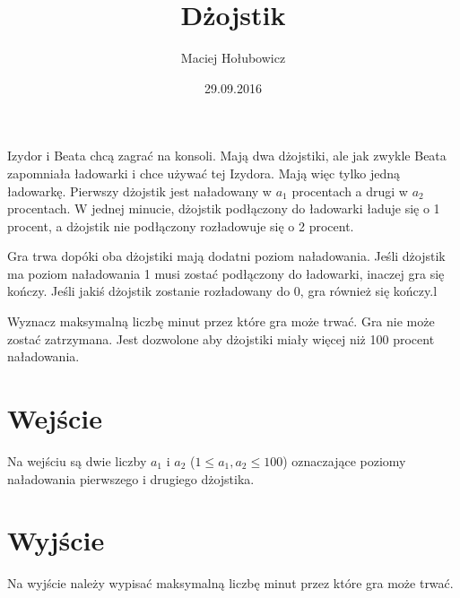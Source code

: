 \documentclass[zad,zawodnik,utf8]{sinol}
\title{Dżojstik}
\author{Maciej Hołubowicz} %
\date{29.09.2016}
\begin{document}
  \begin{tasktext}%
  Izydor i Beata chcą zagrać na konsoli. Mają dwa dżojstiki, ale jak zwykle Beata zapomniała ładowarki i chce używać tej Izydora. Mają więc tylko jedną ładowarkę. Pierwszy dżojstik jest naładowany w $a_1$ procentach a drugi w $a_2$ procentach. W jednej minucie, dżojstik podłączony do ładowarki ładuje się o 1 procent, a dżojstik nie podłączony rozładowuje się o 2 procent.
  
  Gra trwa dopóki oba dżojstiki mają dodatni poziom naładowania. Jeśli dżojstik ma poziom naładowania 1 musi zostać podłączony do ładowarki, inaczej gra się kończy. Jeśli jakiś dżojstik zostanie rozładowany do 0, gra również się kończy.l
  
  Wyznacz maksymalną liczbę minut przez które gra może trwać. Gra nie może zostać zatrzymana. Jest dozwolone aby dżojstiki miały więcej niż 100 procent naładowania.
  
  
 \section{Wejście}
    
  Na wejściu są dwie liczby $a_1$ i $a_2$ ($ 1 \leq a_1, a_2 \leq 100$) oznaczające poziomy naładowania pierwszego i drugiego dżojstika.

  \section{Wyjście}
    Na wyjście należy wypisać maksymalną liczbę minut przez które gra może trwać.
    
     \makecompactexample

  \end{tasktext}
\end{document}
